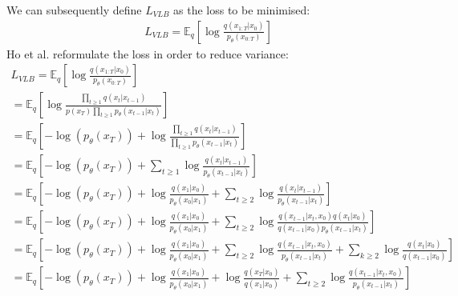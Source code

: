 \documentclass{article}
\begin{document}
We can subsequently define $L_{VLB}$ as the loss to be minimised:
\begin{gather}
  L_{VLB} = \mathbb{E}_q \left[\log \frac{q\left(x_{1:T}|x_0\right)}{p_{\theta}\left(x_{0:T}\right)}\right] \label{eq:16}
\end{gather}
Ho et al. \cite{ho2020denoising} reformulate the loss in order to reduce variance:
\begin{gather}
  L_{VLB} = \mathbb{E}_q \left[\log \frac{q\left(x_{1:T}|x_0\right)}{p_{\theta}\left(x_{0:T}\right)}\right] \label{eq:17} \\
  = \mathbb{E}_q \left[\log \frac{\prod_{t \geq 1} q\left(x_t | x_{t-1}\right)}{p\left(x_T\right) \prod_{t \geq 1} p_{\theta}\left(x_{t-1} | x_t\right)}\right] \label{eq:18} \\
  = \mathbb{E}_q \left[-\log\left(p_{\theta}\left(x_T\right)\right) + \log \frac{\prod_{t \geq 1} q\left(x_t | x_{t-1}\right)}{\prod_{t \geq 1} p_{\theta}\left(x_{t-1} | x_t\right)}\right] \label{eq:19} \\
  = \mathbb{E}_q \left[-\log\left(p_{\theta}\left(x_T\right)\right) + \sum_{t \geq 1} \log \frac{q\left(x_t | x_{t-1}\right)}{p_{\theta}\left(x_{t-1} | x_t\right)}\right] \label{eq:20} \\
  = \mathbb{E}_q \left[-\log\left(p_{\theta}\left(x_T\right)\right) + \log \frac{q\left(x_1 | x_0\right)}{p_{\theta}\left(x_0 | x_1\right)} + \sum_{t \geq 2} \log \frac{q\left(x_t | x_{t-1}\right)}{p_{\theta}\left(x_{t-1} | x_t\right)}\right] \label{eq:21} \\
  = \mathbb{E}_q \left[-\log\left(p_{\theta}\left(x_T\right)\right) + \log \frac{q\left(x_1 | x_0\right)}{p_{\theta}\left(x_0 | x_1\right)} + \sum_{t \geq 2} \log \frac{q\left(x_{t-1} | x_t, x_0\right) q\left(x_t | x_0\right)}{{q\left(x_{t-1} | x_0\right)} p_{\theta}\left(x_{t-1} | x_t\right)}\right] \label{eq:22} \\
  = \mathbb{E}_q \left[-\log\left(p_{\theta}\left(x_T\right)\right) + \log \frac{q\left(x_1 | x_0\right)}{p_{\theta}\left(x_0 | x_1\right)} + \sum_{t \geq 2} \log \frac{q\left(x_{t-1} | x_t, x_0\right)}{p_{\theta}\left(x_{t-1} | x_t\right)} + \sum_{k \geq 2} \log \frac{q\left(x_t | x_0\right)}{q\left(x_{t-1} | x_0\right)}\right] \label{eq:23} \\
  = \mathbb{E}_q \left[-\log\left(p_{\theta}\left(x_T\right)\right) + \log \frac{q\left(x_1 | x_0\right)}{p_{\theta}\left(x_0 | x_1\right)} + \log \frac{q\left(x_T | x_0\right)}{q\left(x_1 | x_0\right)} + \sum_{t \geq 2} \log \frac{q\left(x_{t-1} | x_t, x_0\right)}{p_{\theta}\left(x_{t-1} | x_t\right)}\right] \label{eq:24} \\

\end{gather}
\end{document}
